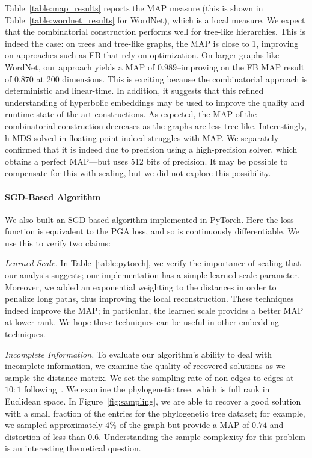 Table~\ref{table:map_results} reports the MAP measure (this is shown in Table~\ref{table:wordnet_results} for WordNet), which is a
local measure. We expect that the combinatorial construction performs
well for tree-like hierarchies. This is indeed the case: on trees and
tree-like graphs, the MAP is close to 1, improving on approaches such
as FB that rely on optimization. On larger graphs like WordNet, our
approach yields a MAP of $0.989$--improving on the FB MAP result of
$0.870$ at 200 dimensions. This is exciting because the combinatorial
approach is deterministic and linear-time. In addition, it suggests
that this refined understanding of hyperbolic embeddings may be used
to improve the quality and runtime state of the art constructions. As
expected, the MAP of the combinatorial construction decreases as the
graphs are less tree-like.
Interestingly, h-MDS solved in
floating point indeed struggles with MAP. We separately confirmed that
it is indeed due to precision using a high-precision solver, which
obtains a perfect MAP---but uses 512 bits of precision. It may be
possible to compensate for this with scaling, but we did not explore
this possibility.


\paragraph*{SGD-Based Algorithm}
We also built an SGD-based algorithm implemented in PyTorch. Here the
loss function is equivalent to the PGA loss, and so is continuously
differentiable. We use this to verify two claims:

\textit{Learned Scale.}
In Table~\ref{table:pytorch}, we verify the importance of scaling that
our analysis suggests; our implementation has a simple learned scale
parameter. Moreover, we added an exponential weighting to the
distances in order to penalize long paths, thus improving the local
reconstruction. These techniques indeed improve the MAP; in
particular, the learned scale provides a better MAP at lower rank. We
hope these techniques can be useful in other embedding techniques.

\textit{Incomplete Information.} 
To evaluate our algorithm's ability to deal with incomplete
information, we examine the quality of recovered solutions as we
sample the distance matrix. We set the sampling rate of non-edges to
edges at $10:1$ following~\citet{fb}. We examine the phylogenetic
tree, which is full rank in Euclidean space. In
Figure~\ref{fig:sampling}, we are able to recover a good solution with a
small fraction of the entries for the phylogenetic tree dataset; for
example, we sampled approximately $4\%$ of the graph but provide a MAP
of $0.74$ and distortion of less than $0.6$. Understanding the sample
complexity for this problem is an interesting theoretical question.



